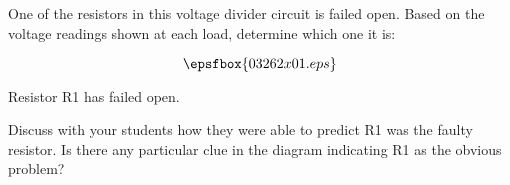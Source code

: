 

One of the resistors in this voltage divider circuit is failed open.  Based on the voltage readings shown at each load, determine which one it is:

$$\epsfbox{03262x01.eps}$$







Resistor R1 has failed open.







Discuss with your students how they were able to predict R1 was the faulty resistor.  Is there any particular clue in the diagram indicating R1 as the obvious problem?




